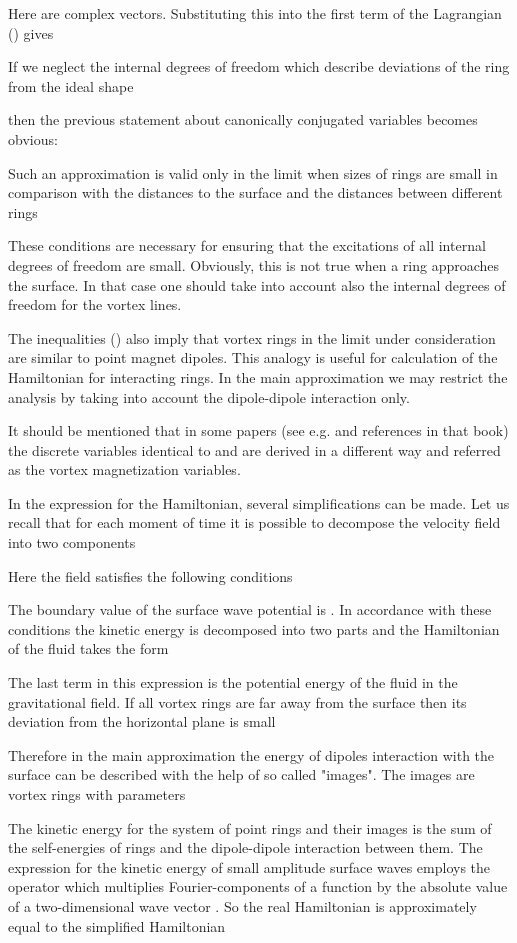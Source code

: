 Here  are complex vectors. Substituting this into the first term
of the Lagrangian () gives


If we neglect the internal degrees of freedom which describe deviations of 
the ring  from the ideal shape

then the previous statement about canonically conjugated variables 
becomes obvious:

Such an approximation is valid only in the 
limit when  sizes of rings are small in comparison with the distances to 
the surface and the distances between different rings

These conditions are necessary for ensuring that the excitations of all internal degrees 
of freedom are small. Obviously, this is not true when a ring approaches 
the surface. In that case one should take into account also the internal 
degrees of freedom for the vortex lines. 

The inequalities () also imply that vortex rings in the limit under 
consideration are similar to  point magnet dipoles. 
This analogy is useful for calculation of the Hamiltonian for interacting 
rings. In the main approximation we may restrict the analysis by 
taking into account the dipole-dipole interaction only.

It should be mentioned that in some papers
(see e.g.  and references in that book) the discrete variables
identical to  and  are derived in a different way and 
referred as the vortex magnetization variables. 

In the expression for the Hamiltonian, several simplifications can be made.
Let us recall that for each moment of time it is possible to decompose 
the velocity field into two components

Here the field  satisfies the following conditions

The boundary value of the surface wave potential  is 
. In accordance with these conditions 
the kinetic energy is decomposed into two parts and the Hamiltonian
of the fluid takes the form

The last term in this expression is the potential energy 
of the fluid in the gravitational field.
If all vortex rings are far away from the surface then its deviation from 
the horizontal plane is small

Therefore in the main approximation the energy of dipoles interaction with
the surface can be described with the help of so called "images". 
The images are vortex rings with parameters


The kinetic energy for the system of point rings and their images is 
the sum of the self-energies of rings and the dipole-dipole interaction between 
them. The expression for the kinetic energy of small amplitude surface waves 
employs the operator  which multiplies Fourier-components of 
a function by the absolute value  of a two-dimensional wave vector .
So the real Hamiltonian  is approximately equal to the simplified 
Hamiltonian 




